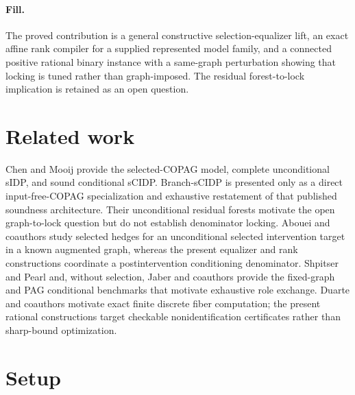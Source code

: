\documentclass{article}
\begin{document}
\paragraph{Fill.} The proved contribution is a general constructive selection-equalizer lift, an exact affine rank compiler for a supplied represented model family, and a connected positive rational binary instance with a same-graph perturbation showing that locking is tuned rather than graph-imposed. The residual forest-to-lock implication is retained as an open question.

\section{Related work}

Chen and Mooij provide the selected-COPAG model, complete unconditional sIDP, and sound conditional sCIDP. Branch-sCIDP is presented only as a direct input-free-COPAG specialization and exhaustive restatement of that published soundness architecture. Their unconditional residual forests motivate the open graph-to-lock question but do not establish denominator locking. Abouei and coauthors study selected hedges for an unconditional selected intervention target in a known augmented graph, whereas the present equalizer and rank constructions coordinate a postintervention conditioning denominator. Shpitser and Pearl and, without selection, Jaber and coauthors provide the fixed-graph and PAG conditional benchmarks that motivate exhaustive role exchange. Duarte and coauthors motivate exact finite discrete fiber computation; the present rational constructions target checkable nonidentification certificates rather than sharp-bound optimization.

\section{Setup}
\end{document}
